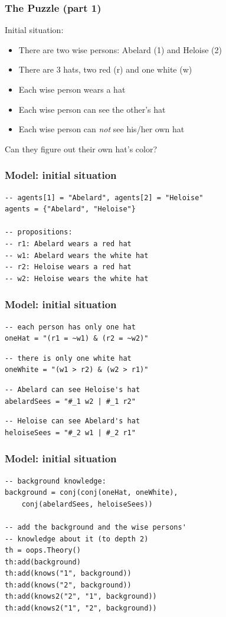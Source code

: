 \documentclass{beamer}
\begin{document}
\begin{frame}
\frametitle{The Puzzle (part 1)}
Initial situation:
\begin{itemize}
\item There are two wise persons: Abelard (1) and Heloise (2)
\item There are 3 hats, two red (r) and one white (w)
\item Each wise person wears a hat
\item Each wise person can see the other's hat
\item Each wise person can {\em not} see his/her own hat
\end{itemize}
Can they figure out their own hat's color?
\end{frame}

\begin{frame}[fragile]
\frametitle{Model: initial situation}

\begin{lstlisting}
-- agents[1] = "Abelard", agents[2] = "Heloise"
agents = {"Abelard", "Heloise"}

-- propositions:
-- r1: Abelard wears a red hat
-- w1: Abelard wears the white hat
-- r2: Heloise wears a red hat
-- w2: Heloise wears the white hat
\end{lstlisting}

\end{frame}

\begin{frame}[fragile]
\frametitle{Model: initial situation}
\begin{lstlisting}
-- each person has only one hat
oneHat = "(r1 = ~w1) & (r2 = ~w2)"
\end{lstlisting}
\pause
\begin{lstlisting}
-- there is only one white hat
oneWhite = "(w1 > r2) & (w2 > r1)"
\end{lstlisting}
\pause
\begin{lstlisting}
-- Abelard can see Heloise's hat
abelardSees = "#_1 w2 | #_1 r2"
\end{lstlisting}
\pause
\begin{lstlisting}
-- Heloise can see Abelard's hat
heloiseSees = "#_2 w1 | #_2 r1"
\end{lstlisting}
\end{frame}

\begin{frame}[fragile]
\frametitle{Model: initial situation}
\begin{lstlisting}
-- background knowledge:
background = conj(conj(oneHat, oneWhite),
    conj(abelardSees, heloiseSees))

-- add the background and the wise persons'
-- knowledge about it (to depth 2)
th = oops.Theory()
th:add(background)
th:add(knows("1", background))
th:add(knows("2", background))
th:add(knows2("2", "1", background))
th:add(knows2("1", "2", background))
\end{lstlisting}
\end{frame}
\end{document}
